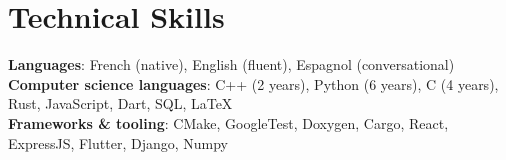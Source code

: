 \section{Technical Skills}

\vspace{-7pt}
\begin{itemize}
[leftmargin=0.15in, label={}]\small{\item{
    \textbf{Languages}{: French (native), English (fluent), Espagnol (conversational)} \\
    \textbf{Computer science languages}{: C++ (2 years), Python (6 years), C (4 years), Rust, JavaScript, Dart, SQL, \LaTeX} \\
    \textbf{Frameworks \& tooling}{: CMake, GoogleTest, Doxygen, Cargo, React, ExpressJS, Flutter, Django, Numpy} \\}}
\end{itemize}
